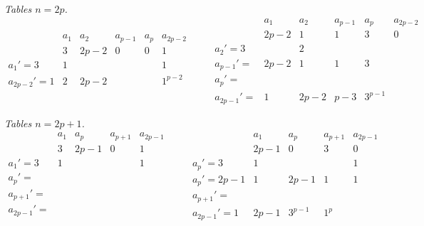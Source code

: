\documentclass[11pt]{article}
\begin{document}
\noindent\textit{Tables $n=2p$.}
\[
\begin{array}{l|ccccc}
              & a_{1} & a_{2} & a_{p-1} & a_{p}    & a_{2p-2}\\
              & 3     & 2p-2  & 0       & 0        & 1\\
\hline
a_{1}'=3      & 1     &       &         &          & 1\\
a_{2p-2}'=1   & 2     & 2p-2  &         &          & 1^{p-2}
\end{array}
\qquad
\begin{array}{l|ccccc}
              & a_{1} & a_{2} & a_{p-1} & a_{p}    & a_{2p-2}\\
              & 2p-2  & 1     & 1       & 3        & 0\\
\hline
a_{2}'=3      &       & 2     &         &          & \\
a_{p-1}'=     & 2p-2  & 1     & 1       & 3        & \\
a_{p}'=       &       &       &         &          & \\
a_{2p-1}'=    & 1     & 2p-2  & p-3     & 3^{p-1}  &
\end{array}
\]


\noindent\textit{Tables $n=2p+1$.}
\[
\begin{array}{l|cccc}
              & a_{1}    & a_{p}    & a_{p+1} & a_{2p-1}\\
              & 3        & 2p-1     & 0       & 1\\
\hline
a_{1}'=3      & 1        &          &         & 1\\
a_{p}'=       &          &          &         & \\
a_{p+1}'=     &          &          &         & \\
a_{2p-1}'=    &          &          &         & \\
\end{array}
\qquad
\begin{array}{l|cccc}
              & a_{1}    & a_{p}    & a_{p+1} & a_{2p-1}\\
              & 2p-1     & 0        & 3       & 0\\
\hline
a_{p}'=3      & 1        &          &         & 1\\
a_{p}'=2p-1   & 1        & 2p-1     & 1       & 1\\
a_{p+1}'=     &          &          &         & \\
a_{2p-1}'=1   & 2p-1     & 3^{p-1}  & 1^{p}   &
\end{array}
\]
\end{document}
